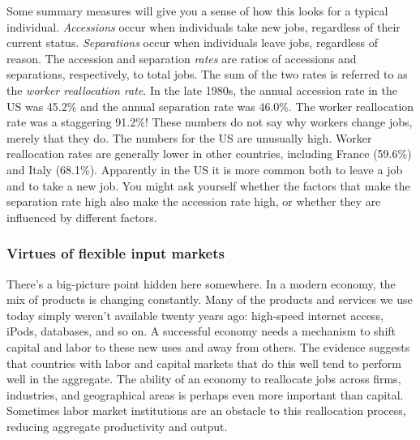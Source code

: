 \documentclass[letterpaper,12pt]{article}
\begin{document}
Some summary measures will give you a sense of how this looks for
a typical individual.  {\it Accessions\/} occur when individuals
take new jobs, regardless of their current status. {\it
Separations\/} occur when individuals leave jobs, regardless of
reason. The accession and separation {\it rates\/} are ratios of
accessions and separations, respectively, to total jobs.  The sum
of the two rates is referred to as the \textit{worker reallocation
rate}. In the late 1980s, the annual accession rate in the US was
45.2\% and the annual separation rate was 46.0\%.  The worker
reallocation rate was a staggering 91.2\%! These numbers do not
say why workers change jobs, merely that they do. The numbers for
the US are unusually high.  Worker reallocation rates are
generally lower in other countries, including France (59.6\%) and
Italy (68.1\%). Apparently in the US it is more common both to
leave a job and to take a new job.
You might ask yourself whether the factors that make the separation rate
high also make the accession rate high, or whether they are
influenced by different factors.

\begin{comment}
Fine points (feel free to skip). Part of worker reallocation is induced by job
reallocation. That is, when a job is created, there is always an
accession and when a job is destroyed there is always a
separation. The opposite, however is not true. Accessions can
occur without a new job being created and separations can occur
without a job being destroyed. This happens whenever a company
substitutes a worker for another one in exactly the same position.
The excess of worker reallocation over job reallocation is called
\textit{excess worker reallocation}.
\end{comment}

\subsubsection*{Virtues of flexible input markets}


There's a big-picture point hidden here somewhere.
In a modern economy, the mix of products is changing constantly.
Many of the products and services we use today
simply weren't available twenty years ago:
high-speed internet access, iPods, databases, and so on.
A successful economy needs a mechanism to shift
capital and labor to these new uses and away from others.
The evidence suggests that countries with labor and capital markets
that do this well tend to perform well in the aggregate.
The ability of an economy to reallocate jobs across
firms, industries, and geographical areas is
perhaps even more important than capital.
Sometimes labor market institutions are an obstacle to this
reallocation process,
reducing aggregate productivity and output.
\end{document}
